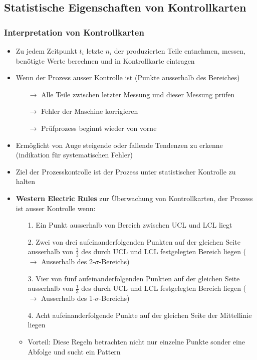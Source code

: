 \subsection{Statistische Eigenschaften von Kontrollkarten}

\subsubsection{Interpretation von Kontrollkarten}
\begin{itemize}
	\item Zu jedem Zeitpunkt $t_i$ letzte $n_i$ der produzierten Teile entnehmen, messen, benötigte Werte berechnen und in Kontrollkarte eintragen
	\item Wenn der Prozess ausser Kontrolle ist (Punkte ausserhalb des Bereiches)
	\begin{itemize}
		\item [$\rightarrow$] Alle Teile zwischen letzter Messung und dieser Messung prüfen
		\item [$\rightarrow$] Fehler der Maschine korrigieren
		\item [$\rightarrow$] Prüfprozess beginnt wieder von vorne
	\end{itemize}
	\item Ermöglicht von Auge steigende oder fallende Tendenzen zu erkenne (indikation für systematischen Fehler)
	\item Ziel der Prozesskontrolle ist der Prozess unter statistischer Kontrolle zu halten
	\item \textbf{Western Electric Rules} zur Überwachung von Kontrollkarten, der Prozess ist ausser Kontrolle wenn:
	\begin{itemize}
		\item [1.] Ein Punkt ausserhalb von Bereich zwischen UCL und LCL liegt
		\item [2.] Zwei von drei aufeinanderfolgenden Punkten auf der gleichen Seite ausserhalb von $\frac{2}{3}$ des durch UCL und LCL festgelegten Bereich liegen ($\rightarrow$ Ausserhalb des 2-$\sigma$-Bereichs)
		\item [3.] Vier von fünf aufeinanderfolgenden Punkten auf der gleichen Seite ausserhalb von $\frac{1}{3}$ des durch UCL und LCL festgelegten Bereich liegen ($\rightarrow$ Ausserhalb des 1-$\sigma$-Bereichs)
		\item [4.] Acht aufeinanderfolgende Punkte auf der gleichen Seite der Mittellinie liegen
		\item Vorteil: Diese Regeln betrachten nicht nur einzelne Punkte sonder eine Abfolge und sucht ein Pattern
	\end{itemize}
\end{itemize}

